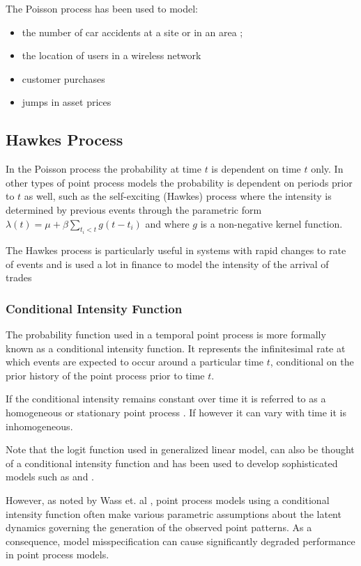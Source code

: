 The Poisson process has been used to model:

\begin{itemize}
	\item the number of car accidents at a site or in an area \parencite{venezian};
	\item the location of users in a wireless network \parencite{blaszczyszyn}
	\item customer purchases \parencite{Ehrenberg}
	\item jumps in asset prices  \parencite{kirch}
\end{itemize}

\subsection{Hawkes Process}
In the Poisson process the probability at time $t$ is dependent on time $t$ only. In other types of point process models the probability is dependent on periods prior to $t$ as well, such as the self-exciting (Hawkes) process where the intensity is determined by previous events through the parametric form $\lambda(t) = \mu + \beta \sum_{t_i<t}g(t-t_i)$ and where $g$ is a non-negative kernel function.

The Hawkes process is particularly useful in systems with rapid changes to rate of events and is used a lot in finance to model the intensity of the arrival of trades \parencite{hardiman2013critical}

\subsubsection{Conditional Intensity Function}
The probability function used in a temporal point process is more formally known as a conditional intensity function. It represents the infinitesimal rate at which events are expected to occur around a particular time $t$, conditional on the prior history of the point process prior to time $t$. 
 
If the conditional intensity remains constant over time it is referred to as a homogeneous or stationary point process \parencite{Nok}. If however it can vary with time it is inhomogeneous. 

Note that the logit function used in generalized linear model, can also be thought of a conditional intensity function and has been used to develop sophisticated models such as \parencite{baddeley2014logistic} and \parencite{rajala2014note}.

However, as noted by Wass et. al \parencite{Wass}, point process models using a conditional intensity function often make various parametric assumptions about the latent dynamics governing the generation of the observed point patterns. As a consequence, model misspecification can cause significantly degraded performance in point process models.

